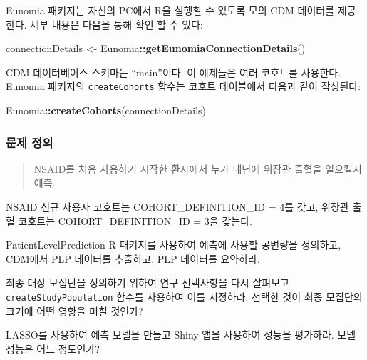 \documentclass[10.5pt]{book}
\newenvironment{Shaded}{\begin{snugshade}}{\end{snugshade}}
\newcommand{\KeywordTok}[1]{\textcolor[rgb]{0.13,0.29,0.53}{\textbf{#1}}}
\newcommand{\StringTok}[1]{\textcolor[rgb]{0.31,0.60,0.02}{#1}}
\newcommand{\OperatorTok}[1]{\textcolor[rgb]{0.81,0.36,0.00}{\textbf{#1}}}
\newcommand{\NormalTok}[1]{#1}
\theoremstyle{definition}
\theoremstyle{definition}
\theoremstyle{definition}
\theoremstyle{remark}
\let\BeginKnitrBlock\begin \let\EndKnitrBlock\end
\begin{document}
Eunomia 패키지는 자신의 PC에서 R을 실행할 수 있도록 모의 CDM 데이터를
제공한다. 세부 내용은 다음을 통해 확인 할 수 있다:

\begin{Shaded}
\begin{Highlighting}[]
\NormalTok{connectionDetails <-}\StringTok{ }\NormalTok{Eunomia}\OperatorTok{::}\KeywordTok{getEunomiaConnectionDetails}\NormalTok{()}
\end{Highlighting}
\end{Shaded}

CDM 데이터베이스 스키마는 ``main''이다. 이 예제들은 여러 코호트를
사용한다. Eunomia 패키지의 \texttt{createCohorts} 함수는 코호트
테이블에서 다음과 같이 작성된다:

\begin{Shaded}
\begin{Highlighting}[]
\NormalTok{Eunomia}\OperatorTok{::}\KeywordTok{createCohorts}\NormalTok{(connectionDetails)}
\end{Highlighting}
\end{Shaded}

\subsubsection*{문제 정의}\label{--4}

\begin{quote}
NSAID를 처음 사용하기 시작한 환자에서 누가 내년에 위장관 출혈을 일으킬지
예측.
\end{quote}

NSAID 신규 사용자 코호트는 COHORT\_DEFINITION\_ID = 4를 갖고, 위장관
출혈 코호트는 COHORT\_DEFINITION\_ID = 3을 갖는다.

\BeginKnitrBlock{exercise}
\protect\hypertarget{exr:exercisePlp1}{}{\label{exr:exercisePlp1}
}PatientLevelPrediction R 패키지를 사용하여 예측에 사용할 공변량을
정의하고, CDM에서 PLP 데이터를 추출하고, PLP 데이터를 요약하라.
\EndKnitrBlock{exercise}

\BeginKnitrBlock{exercise}
\protect\hypertarget{exr:exercisePlp2}{}{\label{exr:exercisePlp2} }최종 대상
모집단을 정의하기 위하여 연구 선택사항을 다시 살펴보고
\texttt{createStudyPopulation} 함수를 사용하여 이를 지정하라. 선택한
것이 최종 모집단의 크기에 어떤 영향을 미칠 것인가?
\EndKnitrBlock{exercise}

\BeginKnitrBlock{exercise}
\protect\hypertarget{exr:exercisePlp3}{}{\label{exr:exercisePlp3} }LASSO를
사용하여 예측 모델을 만들고 Shiny 앱을 사용하여 성능을 평가하라. 모델
성능은 어느 정도인가?
\EndKnitrBlock{exercise}
\end{document}
